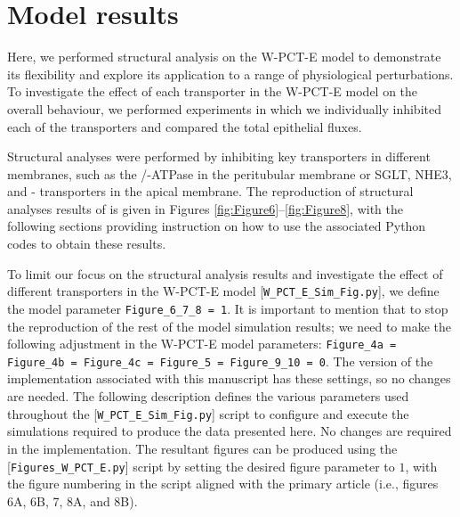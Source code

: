 \documentclass[fleqn,10pt]{physiome}
\begin{document}
\section{Model results}
 Here, we performed structural analysis on the W-PCT-E model to demonstrate its flexibility and explore its application to a range of physiological perturbations.
 To investigate the effect of each transporter in the W-PCT-E model on the overall behaviour, we performed experiments in which we individually inhibited each of the transporters and compared the total epithelial fluxes.
 
 Structural analyses were performed by inhibiting key transporters in different membranes, such as the /-ATPase in the peritubular membrane or SGLT, NHE3, and - transporters in the apical membrane. The reproduction of structural analyses results of \citet{noroozbabaee2022modular} is given in Figures \ref{fig:Figure6}--\ref{fig:Figure8}, with the following sections providing instruction on how to use the associated Python codes to obtain these results.
 
To limit our focus on the structural analysis results and investigate the effect of different transporters in the W-PCT-E model [\texttt{W\_PCT\_E\_Sim\_Fig.py}], we define the model parameter \texttt{Figure\_6\_7\_8 = 1}. It is important to mention that to stop the reproduction of the rest of the model simulation results; we need to make the following adjustment in the W-PCT-E model parameters: \texttt{Figure\_4a = Figure\_4b = Figure\_4c = Figure\_5 = Figure\_9\_10 = 0}. The version of the implementation associated with this manuscript has these settings, so no changes are needed. The following description defines the various parameters used throughout the [\texttt{W\_PCT\_E\_Sim\_Fig.py}] script to configure and execute the simulations required to produce the data presented here. No changes are required in the implementation. The resultant figures can be produced using the [\texttt{Figures\_W\_PCT\_E.py}] script by setting the desired figure parameter to $1$, with the figure numbering in the script aligned with the primary article (i.e., figures 6A, 6B, 7, 8A, and 8B).
\end{document}
